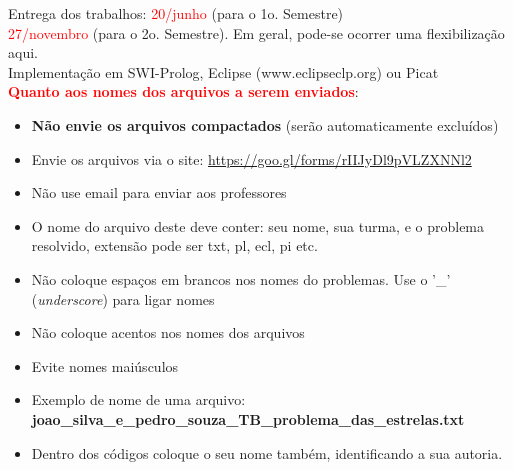 \documentclass[a4paper,12pt]{article}
\begin{document}
\begin{flushleft}
\vspace{0.5cm}
 Entrega dos trabalhos: \textcolor{red}{20/junho} (para o 1o. Semestre)\\
\textcolor{red}{27/novembro} (para o 2o. Semestre). Em geral, pode-se
ocorrer uma flexibilização aqui.\\



\vspace{0.5cm}
 Implementação em SWI-Prolog, Eclipse (www.eclipseclp.org) ou Picat\\

\vspace{0.5cm}
 \textcolor{red}{\textbf{Quanto aos nomes dos arquivos a serem enviados}}:
\begin{itemize}
  \item \textbf{Não envie os arquivos compactados} (serão automaticamente excluídos)
  \item Envie os arquivos  via o site: \textcolor{red}{\url{https://goo.gl/forms/rIIJyDl9pVLZXNNl2} }\\

  \item Não use email para enviar aos professores
  
  \item O nome do arquivo deste deve conter: seu nome,
  sua turma, e o problema resolvido, extensão pode ser txt, pl, ecl, pi etc.
  \item Não coloque espaços em brancos nos nomes do problemas. Use o '\_'  (\textit{underscore}) para ligar nomes
  
  \item Não coloque acentos nos nomes dos arquivos
  
  \item Evite nomes maiúsculos
  
  \item Exemplo de nome de uma arquivo: \\ \textbf{joao\_silva\_e\_pedro\_souza\_TB\_problema\_das\_estrelas.txt}
  
  \item Dentro dos códigos coloque o seu nome também, identificando a sua autoria.
  
\end{itemize}



\end{flushleft}
\end{document}
